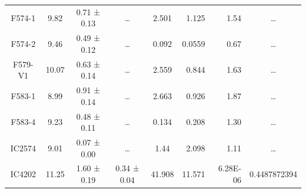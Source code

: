 \documentclass[reprint,%
 amsmath,amssymb,
 aps,
]{revtex4-1}
\begin{document}
\begin{table}[]
\begin{tabular}{cccccrrc}
\rowcolor[HTML]{F3F3F3} 
F574-1               & 9.82                      & 0.71 ± 0.13           & …                      & 2.501                                                        & 1.125                                                           & 1.54                                                           & …                                                             \\
\rowcolor[HTML]{F3F3F3} 
F574-2               & 9.46                      & 0.49 ± 0.12           & …                      & 0.092                                                        & 0.0559                                                         & 0.67                                                          & …                                                             \\
\rowcolor[HTML]{F3F3F3} 
F579-V1              & 10.07                     & 0.63 ± 0.14           & …                      & 2.559                                                        & 0.844                                                         & 1.63                                                           & …                                                             \\
\rowcolor[HTML]{F3F3F3} 
F583-1               & 8.99                      & 0.91 ± 0.14           & …                      & 2.663                                                        & 0.926                                                          & 1.87                                                            & …                                                             \\
\rowcolor[HTML]{F3F3F3} 
F583-4               & 9.23                      & 0.48 ± 0.11           & …                      & 0.134                                                        & 0.208                                                          & 1.30                                                           & …                                                             \\
\rowcolor[HTML]{F3F3F3} 
IC2574               & 9.01                      & 0.07 ± 0.00           & …                      & 1.44                                                         & 2.098                                                          & 1.11                                                           & …                                                             \\
\rowcolor[HTML]{F3F3F3} 
IC4202               & 11.25                     & 1.60 ± 0.19           & 0.34 ± 0.04            & 41.908                                                       & 11.571                                                         & 6.28E-06                                                              & \multicolumn{1}{r}{\cellcolor[HTML]{F3F3F3}0.4487872394}      \\

\end{tabular}
\end{table}
\end{document}
